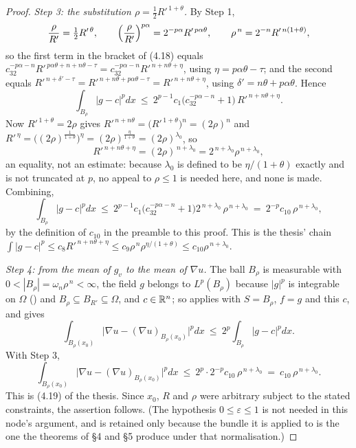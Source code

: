 \begin{proof}
\emph{Step 3: the substitution $\rho=\frac12R'^{\,1+\theta}$.}  By Step 1,
\[
\frac\rho{R'}=\tfrac12R'^{\,\theta},
\qquad
\Bigl(\frac\rho{R'}\Bigr)^{p\alpha}=2^{-p\alpha}R'^{\,p\alpha\theta},
\qquad
\rho^{\,n}=2^{-n}R'^{\,n(1+\theta)} ,
\]
so the first term in the bracket of (4.18) equals
$c_32^{-p\alpha-n}R'^{\,p\alpha\theta+n+n\theta-\tau}
=c_32^{-p\alpha-n}R'^{\,n+n\theta+\eta}$, using $\eta=p\alpha\theta-\tau$; and
the second equals $R'^{\,n+\delta'-\tau}=R'^{\,n+n\theta+p\alpha\theta-\tau}
=R'^{\,n+n\theta+\eta}$, using $\delta'=n\theta+p\alpha\theta$.  Hence
\[
\int_{B_\rho}|g-c|^{p}dx
\ \le\ 2^{p-1}c_1\bigl(c_32^{-p\alpha-n}+1\bigr)\,R'^{\,n+n\theta+\eta} .
\]
Now $R'^{\,1+\theta}=2\rho$ gives
$R'^{\,n+n\theta}=\bigl(R'^{\,1+\theta}\bigr)^{n}=(2\rho)^{n}$ and
$R'^{\,\eta}=\bigl((2\rho)^{\frac1{1+\theta}}\bigr)^{\eta}
=(2\rho)^{\frac\eta{1+\theta}}=(2\rho)^{\lambda_0}$, so
\[
R'^{\,n+n\theta+\eta}=(2\rho)^{\,n+\lambda_0}
=2^{\,n+\lambda_0}\rho^{\,n+\lambda_0},
\]
an equality, not an estimate: because $\lambda_0$ is defined to be
$\eta/(1+\theta)$ exactly and is not truncated at $p$, no appeal to $\rho\le1$
is needed here, and none is made.  Combining,
\[
\int_{B_\rho}|g-c|^{p}dx
\ \le\ 2^{p-1}c_1\bigl(c_32^{-p\alpha-n}+1\bigr)2^{\,n+\lambda_0}
\,\rho^{\,n+\lambda_0}
\ =\ 2^{-p}c_{10}\,\rho^{\,n+\lambda_0},
\]
by the definition of $c_{10}$ in the preamble to this proof.  This is the thesis'
chain
$\int|g-c|^p\le c_8R'^{\,n+n\theta+\eta}\le c_9\rho^{\,n}\rho^{\eta/(1+\theta)}
\le c_{10}\rho^{\,n+\lambda_0}$.

\emph{Step 4: from the mean of $g_v$ to the mean of $\nabla u$.}  The ball
$B_\rho$ is measurable with $0<|B_\rho|=\omega_n\rho^{\,n}<\infty$, the field
$g$ belongs to $L^p(B_\rho)$ because $|g|^p$ is integrable on $\Omega$
() and $B_\rho\subseteq B_{R'}\subseteq\Omega$, and
$c\in\mathbb{R}^n$; so  applies with $S=B_\rho$, $f=g$ and
this $c$, and gives
\[
\int_{B_\rho(x_0)}\bigl|\nabla u-(\nabla u)_{B_\rho(x_0)}\bigr|^{p}dx
\ \le\ 2^{p}\int_{B_\rho}|g-c|^{p}dx .
\]
With Step 3,
\[
\int_{B_\rho(x_0)}\bigl|\nabla u-(\nabla u)_{B_\rho(x_0)}\bigr|^{p}dx
\ \le\ 2^{p}\cdot2^{-p}c_{10}\,\rho^{\,n+\lambda_0}
\ =\ c_{10}\,\rho^{\,n+\lambda_0}.
\]
This is (4.19) of the thesis.  Since $x_0$, $R$ and $\rho$ were arbitrary subject to
the stated constraints, the assertion follows.  (The hypothesis
$0\le\varepsilon\le1$ is not needed in this node's argument, and is retained
only because the bundle it is applied to is the one the theorems of \S4 and \S5
produce under that normalisation.)
\end{proof}
